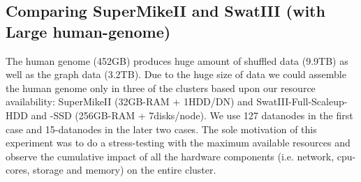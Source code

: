\documentclass[conference]{IEEEtran}
\begin{document}
\subsection {Comparing SuperMikeII and SwatIII (with Large human-genome)} \label{SecPerfDiffArchHum}
The human genome (452GB) produces huge amount of shuffled data (9.9TB) as well as the graph data (3.2TB). Due to the huge size of data we could assemble the human genome only in three of the clusters based upon our resource availability: SuperMikeII (32GB-RAM + 1HDD/DN) and SwatIII-Full-Scaleup-HDD and -SSD (256GB-RAM + 7disks/node). We use 127 datanodes in the first case and 15-datanodes in the later two cases.
The sole motivation of this experiment was to do a stress-testing with the maximum available resources and observe the cumulative impact of all the hardware components (i.e. network, cpu-cores, storage and memory) on the entire cluster.
\end{document}
